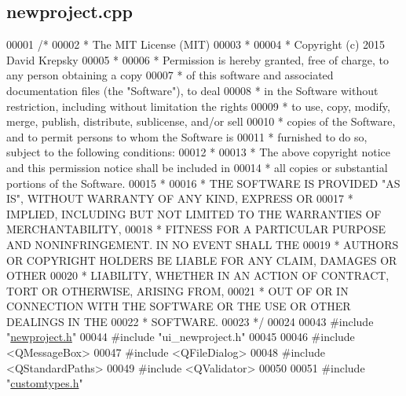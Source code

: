 \hypertarget{newproject_8cpp_source}{}\subsection{newproject.\+cpp}
\label{newproject_8cpp_source}

\begin{DoxyCode}
00001 \textcolor{comment}{/*}
00002 \textcolor{comment}{ * The MIT License (MIT)}
00003 \textcolor{comment}{ *}
00004 \textcolor{comment}{ * Copyright (c) 2015 David Krepsky}
00005 \textcolor{comment}{ *}
00006 \textcolor{comment}{ * Permission is hereby granted, free of charge, to any person obtaining a copy}
00007 \textcolor{comment}{ * of this software and associated documentation files (the "Software"), to deal}
00008 \textcolor{comment}{ * in the Software without restriction, including without limitation the rights}
00009 \textcolor{comment}{ * to use, copy, modify, merge, publish, distribute, sublicense, and/or sell}
00010 \textcolor{comment}{ * copies of the Software, and to permit persons to whom the Software is}
00011 \textcolor{comment}{ * furnished to do so, subject to the following conditions:}
00012 \textcolor{comment}{ *}
00013 \textcolor{comment}{ * The above copyright notice and this permission notice shall be included in}
00014 \textcolor{comment}{ * all copies or substantial portions of the Software.}
00015 \textcolor{comment}{ *}
00016 \textcolor{comment}{ * THE SOFTWARE IS PROVIDED "AS IS", WITHOUT WARRANTY OF ANY KIND, EXPRESS OR}
00017 \textcolor{comment}{ * IMPLIED, INCLUDING BUT NOT LIMITED TO THE WARRANTIES OF MERCHANTABILITY,}
00018 \textcolor{comment}{ * FITNESS FOR A PARTICULAR PURPOSE AND NONINFRINGEMENT. IN NO EVENT SHALL THE}
00019 \textcolor{comment}{ * AUTHORS OR COPYRIGHT HOLDERS BE LIABLE FOR ANY CLAIM, DAMAGES OR OTHER}
00020 \textcolor{comment}{ * LIABILITY, WHETHER IN AN ACTION OF CONTRACT, TORT OR OTHERWISE, ARISING FROM,}
00021 \textcolor{comment}{ * OUT OF OR IN CONNECTION WITH THE SOFTWARE OR THE USE OR OTHER DEALINGS IN THE}
00022 \textcolor{comment}{ * SOFTWARE.}
00023 \textcolor{comment}{ */}
00024 
00043 \textcolor{preprocessor}{#include "\hyperlink{newproject_8h}{newproject.h}"}
00044 \textcolor{preprocessor}{#include "ui\_newproject.h"}
00045 
00046 \textcolor{preprocessor}{#include <QMessageBox>}
00047 \textcolor{preprocessor}{#include <QFileDialog>}
00048 \textcolor{preprocessor}{#include <QStandardPaths>}
00049 \textcolor{preprocessor}{#include <QValidator>}
00050 
00051 \textcolor{preprocessor}{#include "\hyperlink{customtypes_8h}{customtypes.h}"}

\end{DoxyCode}
